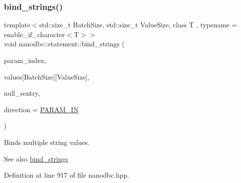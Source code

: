 \subsubsection{\texorpdfstring{bind\_strings()}{bind\_strings()}\hspace{0.1cm}{\footnotesize\ttfamily [6/9]}}
{\footnotesize\ttfamily template$<$std\+::size\+\_\+t Batch\+Size, std\+::size\+\_\+t Value\+Size, class T , typename  = enable\+\_\+if\+\_\+character$<$\+T$>$$>$ \\
void nanodbc\+::statement\+::bind\+\_\+strings (\begin{DoxyParamCaption}\item[{short}]{param\+\_\+index,  }\item[{T const (\&)}]{values\mbox{[}\+Batch\+Size\mbox{]}\mbox{[}\+Value\+Size\mbox{]},  }\item[{T const $\ast$}]{null\+\_\+sentry,  }\item[{\mbox{\hyperlink{classnanodbc_1_1statement_a523142f53cbbee8d68a074da993e7fa6}{param\+\_\+direction}}}]{direction = {\ttfamily \mbox{\hyperlink{classnanodbc_1_1statement_a523142f53cbbee8d68a074da993e7fa6ae33f42ce0677d00c291ff4d8e39f99de}{P\+A\+R\+A\+M\+\_\+\+IN}}} }\end{DoxyParamCaption})\hspace{0.3cm}{\ttfamily [inline]}}



Binds multiple string values. 

\begin{DoxySeeAlso}{See also}
\mbox{\hyperlink{group__bind__strings_ga8914c229f28ee7b02cf1b85684741326}{bind\+\_\+strings}} 
\end{DoxySeeAlso}


Definition at line 917 of file nanodbc.\+hpp.

\mbox{\label{group__bind__strings_gadfdbae0cd7e7bf3737715bd32904438c}} 
